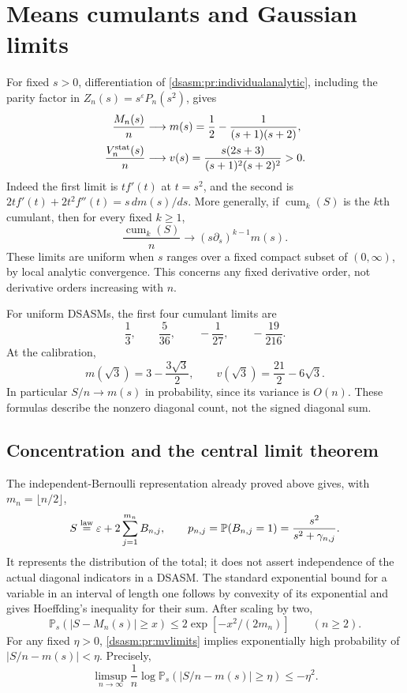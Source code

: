 \documentclass[11pt,letterpaper]{article}
\theoremstyle{remark}\newtheorem{remark}[theorem]{Remark}
\newcommand{\eps}{\varepsilon}\newcommand{\HH}{\mathcal H}\newcommand{\one}{\mathbf1}
\begin{document}
\section{Means cumulants and Gaussian limits}
\label{dsasm:pr:sec:statistics}
For fixed $s>0$, differentiation of
\eqref{dsasm:pr:individualanalytic}, including the parity factor in
$Z_n(s)=s^\eps P_n(s^2)$, gives
\begin{equation}\label{dsasm:pr:mvlimits}
\begin{split}
 \frac{M_n(s)}n&\longrightarrow m(s)
   =\frac12-\frac1{(s+1)(s+2)},\\
 \frac{V_n^{\rm stat}(s)}n&\longrightarrow v(s)
   =\frac{s(2s+3)}{(s+1)^2(s+2)^2}>0.
\end{split}
\end{equation}
Indeed the first limit is $t f'(t)$ at $t=s^2$, and the second is
$2t f'(t)+2t^2f''(t)=s\,d m(s)/ds$.
More generally, if $\operatorname{cum}_k(S)$ is the $k$th cumulant,
then for every fixed $k\ge1$,
\begin{equation}\label{dsasm:pr:cumulants}
 \frac{\operatorname{cum}_k(S)}n\longrightarrow
 (s\partial_s)^{k-1}m(s).
\end{equation}
These limits are uniform when $s$ ranges over a fixed compact subset
of $(0,\infty)$, by local analytic convergence. This concerns any
fixed derivative order, not derivative orders increasing with $n$.

For uniform DSASMs, the first four cumulant limits are
\begin{equation}\label{dsasm:pr:uniformstats}
 \frac13,\qquad\frac5{36},\qquad-\frac1{27},\qquad-\frac{19}{216}.
\end{equation}
At the calibration,
\[
 m(\sqrt3)=3-\frac{3\sqrt3}{2},\qquad
 v(\sqrt3)=\frac{21}{2}-6\sqrt3.
\]
In particular $S/n\to m(s)$ in probability, since its variance is
$O(n)$. These formulas describe the nonzero diagonal count, not the
signed diagonal sum.

\subsection{Concentration and the central limit theorem}
The independent-Bernoulli representation already proved above gives,
with $m_n=\lfloor n/2\rfloor$,
\[
 S\overset{\rm law}=\eps+2\sum_{j=1}^{m_n}B_{n,j},\qquad
 p_{n,j}=\mathbb P(B_{n,j}=1)=\frac{s^2}{s^2+\gamma_{n,j}}.
\]
It represents the distribution of the total; it does not assert
independence of the actual diagonal indicators in a DSASM.
The standard exponential bound for a variable in an interval of length
one follows by convexity of its exponential and gives Hoeffding's
inequality for their sum. After scaling by two,
\begin{equation}\label{dsasm:pr:hoeffding}
 \mathbb P_s(|S-M_n(s)|\ge x)
 \le2\exp[-x^2/(2m_n)]\qquad(n\ge2).
\end{equation}
For any fixed $\eta>0$, \eqref{dsasm:pr:mvlimits} implies exponentially high
probability of $|S/n-m(s)|<\eta$. Precisely,
\[
 \limsup_{n\to\infty}\frac1n\log\mathbb P_s(|S/n-m(s)|\ge\eta)
 \le-\eta^2.
\]
\end{document}
